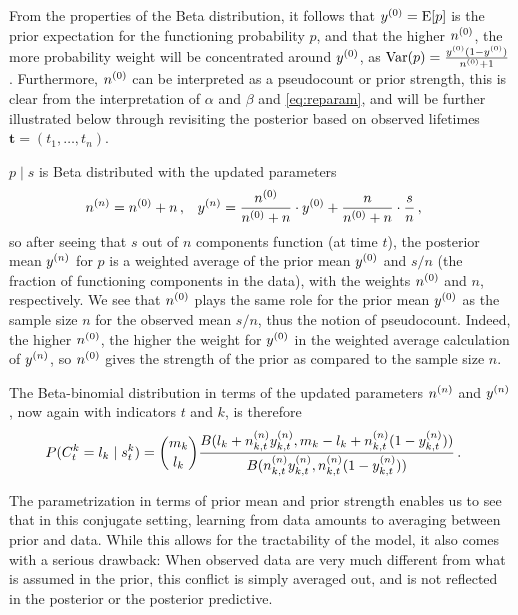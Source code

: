 \documentclass[authoryear, 12pt, a4paper]{elsarticle}
\newcommand{\bs}[1]{\boldsymbol{#1}}
\renewcommand{\vec}[1]{{\bs#1}}
\newcommand{\E}{\operatorname{E}}
\newcommand{\V}{\operatorname{Var}}
\newcommand{\td}[1]{%
  \iftoggle{td}{%
    \todo[inline]{#1}%
  }{}%
}
\begin{document}
From the properties of the Beta distribution,
it follows that $\yz = \E[p]$ is the prior expectation for the functioning probability $p$,
and that the higher $n^{(0)}$, the more probability weight will be concentrated around $y^{(0)}$,
as $\V(p) = \frac{\yz (1-\yz)}{\nz + 1}$.
Furthermore, $n^{(0)}$ can be interpreted as a pseudocount or prior strength,
this is clear from the interpretation of $\alpha$ and $\beta$ and \eqref{eq:reparam},
and will be further illustrated below through revisiting the posterior
based on observed lifetimes $\vec{t} = (t_1, \ldots, t_{n})$.

$p \mid s$ is Beta distributed with the updated parameters
\begin{align}
n^{(n)} &= n^{(0)} + n\,, &
y^{(n)} &= \frac{n^{(0)}}{n^{(0)} + n} \cdot y^{(0)} + \frac{n}{n^{(0)} + n} \cdot \frac{s}{n}\,,
\label{eq:nyupdate}
\end{align}
so after seeing that $s$ out of $n$ components function (at time $t$),
the posterior mean $y^{(n)}$ for $p$ is a weighted average of
the prior mean $y^{(0)}$ and $s/n$ (the fraction of functioning components in the data),
with the weights $n^{(0)}$ and $n$, respectively.
We see that $n^{(0)}$ plays the same role for the prior mean $y^{(0)}$
as the sample size $n$ for the observed mean $s/n$,
thus the notion of pseudocount.
Indeed, the higher $n^{(0)}$, the higher the weight for $y^{(0)}$
in the weighted average calculation of $y^{(n)}$,
so $n^{(0)}$ gives the strength of the prior as compared to the sample size $n$.

The Beta-binomial distribution in terms of the updated parameters $n^{(n)}$ and $y^{(n)}$,
now again with indicators $t$ and $k$,
is therefore
\begin{align}
P(C^k_t = l_k \mid s^k_t) &= {m_k \choose l_k} \frac{B(l_k + n^{(n)}_{k,t}y^{(n)}_{k,t}, m_k - l_k + n^{(n)}_{k,t}(1-y^{(n)}_{k,t}))}
                                                    {B(n^{(n)}_{k,t}y^{(n)}_{k,t}, n^{(n)}_{k,t}(1-y^{(n)}_{k,t}))} \,.
\label{eq:postpredCny}
\end{align}

The parametrization in terms of prior mean and prior strength
enables us to see that in this conjugate setting,
learning from data amounts to averaging between prior and data.
While this allows for the tractability of the model,
it also comes with a serious drawback:
When observed data are very much different from what is assumed in the prior,
this conflict is simply averaged out,
and is not reflected in the posterior or the posterior predictive.
\end{document}
